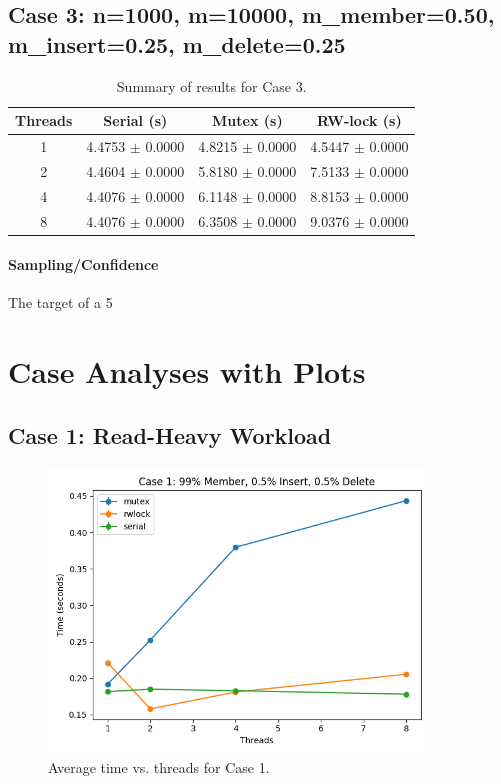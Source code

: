 \documentclass{article}
\begin{document}
\subsection*{Case 3: n=1000, m=10000, m\_member=0.50, m\_insert=0.25, m\_delete=0.25}
\begin{table}[h!]
\centering
\begin{tabular}{cccc}
\toprule
\textbf{Threads} & \textbf{Serial (s)} & \textbf{Mutex (s)} & \textbf{RW-lock (s)} \\
\midrule
1 & 4.4753 $\pm$ 0.0000 & 4.8215 $\pm$ 0.0000 & 4.5447 $\pm$ 0.0000 \\
2 & 4.4604 $\pm$ 0.0000 & 5.8180 $\pm$ 0.0000 & 7.5133 $\pm$ 0.0000 \\
4 & 4.4076 $\pm$ 0.0000 & 6.1148 $\pm$ 0.0000 & 8.8153 $\pm$ 0.0000 \\
8 & 4.4076 $\pm$ 0.0000 & 6.3508 $\pm$ 0.0000 & 9.0376 $\pm$ 0.0000 \\
\bottomrule
\end{tabular}
\caption{Summary of results for Case 3.}
\label{tab:case3}
\end{table}
\paragraph{Sampling/Confidence}
The target of a 5%
\newpage
\section*{Case Analyses with Plots}
\subsection*{Case 1: Read-Heavy Workload}
\begin{figure}[h!]
\centering
\includegraphics[width=0.9\textwidth]{report/graphs/case1_plot.png}
\caption{Average time vs. threads for Case 1.}
\label{fig:case1}
\end{figure}
\end{document}
